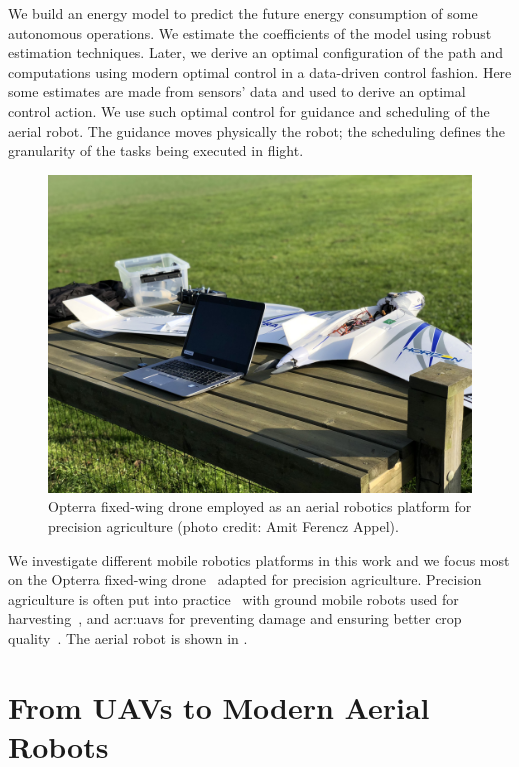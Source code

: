 We build an energy model to predict the future energy consumption of some autonomous operations. We estimate the coefficients of the model using robust estimation techniques. Later, we derive an optimal configuration of the path and computations using modern optimal control in a data-driven control fashion. Here some estimates are made from sensors' data and used to derive an optimal control action. We use such optimal control for guidance and scheduling of the aerial robot. The guidance moves physically the robot; the scheduling defines the granularity of the tasks being executed in flight.

\begin{figure}[t]
  \centering
  \includegraphics[width=.7\textwidth]{pictures/photo}
  \caption[Opterra fixed-wing drone]{Opterra fixed-wing drone employed as an aerial robotics platform for precision agriculture {\scriptsize(photo credit: Amit Ferencz Appel)}.}   
  \label{fig:opterra}
\end{figure}

We investigate different mobile robotics platforms in this work and we focus most on the Opterra fixed-wing drone~\citep{opterra} adapted for precision agriculture. Precision agriculture is often put into practice~\citep{hajjaj2014review} with ground mobile robots used for harvesting~\citep{qingchun2012study,dong2011development, de2011design, aljanobi2010setup, li2008analysis, edan2000robotic}, and \Gls{acr:uav}s for preventing damage and ensuring better crop quality~\citep{puri2017agriculture, daponte2019review}. The aerial robot is shown in .


\section{From UAVs to Modern Aerial Robots}


